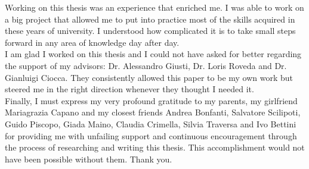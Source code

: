  
Working on this thesis was an experience that enriched me. I was able to work on a big project that allowed me to put into practice most of the skills acquired in these years of university. I understood how complicated it is to take small steps forward in any area of knowledge day after day. \\

\noindent I am glad I worked on this thesis and I could not have asked for better regarding the support of my advisors: Dr. Alessandro Giusti, Dr. Loris Roveda and Dr. Gianluigi Ciocca. They consistently allowed this paper to be my own work but steered me in the right direction whenever they thought I needed it. \\

\noindent Finally, I must express my very profound gratitude to my parents, my girlfriend Mariagrazia Capano and my closest friends Andrea Bonfanti, Salvatore Scilipoti, Guido Piscopo, Giada Maino, Claudia Crimella, Silvia Traversa and Ivo Bettini for providing me with unfailing support and continuous encouragement through the process of researching and writing this thesis. This accomplishment would not have been possible without them. Thank you.